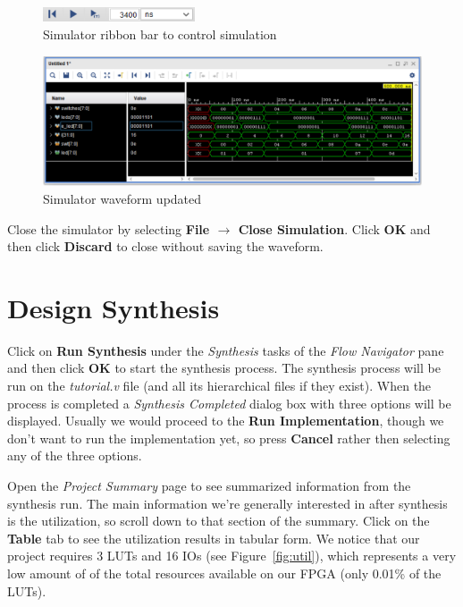 \documentclass[11pt]{article}
\begin{document}
\begin{figure}[!h]
    \centering
    \includegraphics[width=0.4\textwidth]{images/sim_button.png}
    \caption{Simulator ribbon bar to control simulation}
    \label{fig:sim_button}
\end{figure}

\begin{figure}[!h]
    \centering
    \includegraphics[width=\textwidth]{images/sim_wave2.png}
    \caption{Simulator waveform updated}
    \label{fig:sim_wave2}
\end{figure}

\noindent
Close the simulator by selecting \textbf{File $\rightarrow$ Close Simulation}. Click \textbf{OK} and then click \textbf{Discard} to close without saving the waveform.




\section{Design Synthesis}
\label{sec:synthesis}
Click on \textbf{Run Synthesis} under the \textit{Synthesis} tasks of the \textit{Flow Navigator} pane and then click \textbf{OK} to start the synthesis process. The synthesis process will be run on the \textit{tutorial.v} file (and all its hierarchical files if they exist). When the process is completed a \textit{Synthesis Completed} dialog box with three options will be displayed. Usually we would proceed to the \textbf{Run Implementation}, though we don't want to run the implementation yet, so press \textbf{Cancel} rather then selecting any of the three options.

Open the \textit{Project Summary} page to see summarized information from the synthesis run. The main information we're generally interested in after synthesis is the utilization, so scroll down to that section of the summary. Click on the \textbf{Table} tab to see the utilization results in tabular form. We notice that our project requires 3 LUTs and 16 IOs (see Figure~\ref{fig:util}), which represents a very low amount of of the total resources available on our FPGA (only 0.01\% of the LUTs).
\end{document}
